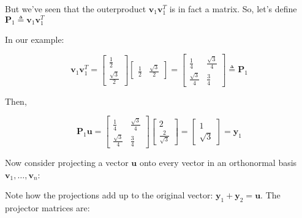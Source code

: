 \documentclass[main.tex]{subfiles}
\begin{document}
But we've seen that the outerproduct $\mathbf{v}_{1} \mathbf{v}_{1}^{T}$ is in fact a matrix. So, let's define $\mathbf{P}_{1} \triangleq \mathbf{v}_{1} \mathbf{v}_{1}^{T}$

In our example:

$$
\mathbf{v}_{1} \mathbf{v}_{1}^{T}=\left[\begin{array}{c}
\frac{1}{2} \\
\frac{\sqrt{3}}{2}
\end{array}\right]\left[\begin{array}{ll}
\frac{1}{2} & \frac{\sqrt{3}}{2}
\end{array}\right]=\left[\begin{array}{cc}
\frac{1}{4} & \frac{\sqrt{3}}{4} \\
\frac{\sqrt{3}}{4} & \frac{3}{4}
\end{array}\right] \triangleq \mathbf{P}_{1}
$$

Then,

$$
\mathbf{P}_{1} \mathbf{u}=\left[\begin{array}{cc}
\frac{1}{4} & \frac{\sqrt{3}}{4} \\
\frac{\sqrt{3}}{4} & \frac{3}{4}
\end{array}\right]\left[\begin{array}{c}
2 \\
\frac{2}{\sqrt{3}}
\end{array}\right]=\left[\begin{array}{r}
1 \\
\sqrt{3}
\end{array}\right]=\mathbf{y}_{1}
$$

Now consider projecting a vector $\mathbf{u}$ onto every vector in an orthonormal basis $\mathbf{v}_{1}, \ldots, \mathbf{v}_{n}$:

Note how the projections add up to the original vector: $\mathbf{y}_{1}+\mathbf{y}_{2}=\mathbf{u}$. The projector matrices are:
\end{document}
